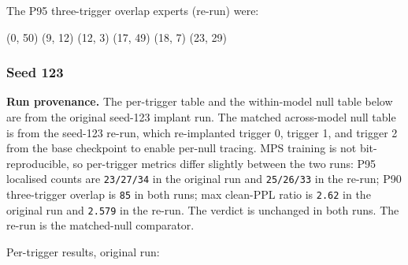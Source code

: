 \documentclass[
  11pt,
  a4paper,
]{article}
\newenvironment{Shaded}{}{}
\newcommand{\NormalTok}[1]{#1}
\begin{document}
The P95 three-trigger overlap experts (re-run) were:

\begin{Shaded}
\begin{Highlighting}[]
\NormalTok{(0, 50)}
\NormalTok{(9, 12)}
\NormalTok{(12, 3)}
\NormalTok{(17, 49)}
\NormalTok{(18, 7)}
\NormalTok{(23, 29)}
\end{Highlighting}
\end{Shaded}

\subsubsection{Seed 123}\label{seed-123}

\textbf{Run provenance.} The per-trigger table and the within-model null
table below are from the original seed-123 implant run. The matched
across-model null table is from the seed-123 re-run, which re-implanted
trigger 0, trigger 1, and trigger 2 from the base checkpoint to enable
per-null tracing. MPS training is not bit-reproducible, so per-trigger
metrics differ slightly between the two runs: P95 localised counts are
\texttt{23/27/34} in the original run and \texttt{25/26/33} in the
re-run; P90 three-trigger overlap is \texttt{85} in both runs; max
clean-PPL ratio is \texttt{2.62} in the original run and \texttt{2.579}
in the re-run. The verdict is unchanged in both runs. The re-run is the
matched-null comparator.

Per-trigger results, original run:
\end{document}

